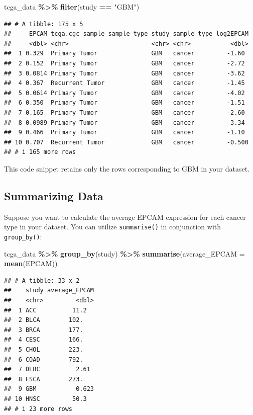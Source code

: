 \documentclass[
]{book}
\newenvironment{Shaded}{\begin{snugshade}}{\end{snugshade}}
\newcommand{\AttributeTok}[1]{\textcolor[rgb]{0.13,0.29,0.53}{#1}}
\newcommand{\FunctionTok}[1]{\textcolor[rgb]{0.13,0.29,0.53}{\textbf{#1}}}
\newcommand{\NormalTok}[1]{#1}
\newcommand{\SpecialCharTok}[1]{\textcolor[rgb]{0.81,0.36,0.00}{\textbf{#1}}}
\newcommand{\StringTok}[1]{\textcolor[rgb]{0.31,0.60,0.02}{#1}}
\begin{document}
\begin{Shaded}
\begin{Highlighting}[]
\NormalTok{tcga\_data }\SpecialCharTok{\%\textgreater{}\%}
  \FunctionTok{filter}\NormalTok{(study }\SpecialCharTok{==} \StringTok{"GBM"}\NormalTok{)}
\end{Highlighting}
\end{Shaded}

\begin{verbatim}
## # A tibble: 175 x 5
##     EPCAM tcga.cgc_sample_sample_type study sample_type log2EPCAM
##     <dbl> <chr>                       <chr> <chr>           <dbl>
##  1 0.329  Primary Tumor               GBM   cancer         -1.60 
##  2 0.152  Primary Tumor               GBM   cancer         -2.72 
##  3 0.0814 Primary Tumor               GBM   cancer         -3.62 
##  4 0.367  Recurrent Tumor             GBM   cancer         -1.45 
##  5 0.0614 Primary Tumor               GBM   cancer         -4.02 
##  6 0.350  Primary Tumor               GBM   cancer         -1.51 
##  7 0.165  Primary Tumor               GBM   cancer         -2.60 
##  8 0.0989 Primary Tumor               GBM   cancer         -3.34 
##  9 0.466  Primary Tumor               GBM   cancer         -1.10 
## 10 0.707  Recurrent Tumor             GBM   cancer         -0.500
## # i 165 more rows
\end{verbatim}

This code snippet retains only the rows corresponding to GBM in your dataset.

\hypertarget{summarizing-data}{%
\subsection{Summarizing Data}\label{summarizing-data}}

Suppose you want to calculate the average EPCAM expression for each cancer type in your dataset. You can utilize \texttt{summarise()} in conjunction with \texttt{group\_by()}:

\begin{Shaded}
\begin{Highlighting}[]
\NormalTok{tcga\_data }\SpecialCharTok{\%\textgreater{}\%}
  \FunctionTok{group\_by}\NormalTok{(study) }\SpecialCharTok{\%\textgreater{}\%}
  \FunctionTok{summarise}\NormalTok{(}\AttributeTok{average\_EPCAM =} \FunctionTok{mean}\NormalTok{(EPCAM))}
\end{Highlighting}
\end{Shaded}

\begin{verbatim}
## # A tibble: 33 x 2
##    study average_EPCAM
##    <chr>         <dbl>
##  1 ACC          11.2  
##  2 BLCA        102.   
##  3 BRCA        177.   
##  4 CESC        166.   
##  5 CHOL        223.   
##  6 COAD        792.   
##  7 DLBC          2.61 
##  8 ESCA        273.   
##  9 GBM           0.623
## 10 HNSC         50.3  
## # i 23 more rows
\end{verbatim}
\end{document}
